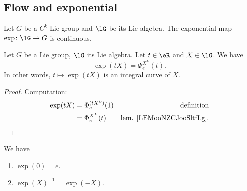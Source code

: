\subsection{Flow and exponential}

\begin{lemma}	\label{LEMooFHYAooNHHlsO}
	Let \( G\) be a \( C^k\) Lie group and \( \lG\) be its Lie algebra. The exponential map \(\exp \colon \lG\to G  \) is continuous.
\end{lemma}



\begin{lemma}        \label{LEMooGKDKooFTsDSr}
	Let \( G\) be a Lie group, \( \lG\) its Lie algebra. Let \( t\in \eR\) and \( X\in\lG\). We have
	\begin{equation}
		\exp(tX)=\Phi_e^{X^L}(t).
	\end{equation}
	In other words, \( t\mapsto \exp(tX)\) is an integral curve of \( X\).
\end{lemma}

\begin{proof}
	Computation:
	\begin{subequations}
		\begin{align}
			\exp(tX) & =\Phi_e^{(tX^L)}(1) & \text{definition}                    \\
			         & =\Phi_e^{X^L}(t)    & \text{lem. \ref{LEMooNZCJooSltfLg}}.
		\end{align}
	\end{subequations}
\end{proof}


\begin{lemma}       \label{LEMooEQFHooRjUAin}
	We have
	\begin{enumerate}
		\item		\label{ITEMooDPTQooDplUXD}
		      \( \exp(0)=e\).
		\item \label{ITEMooTQHIooFLaOnX}
		      \( \exp(X)^{-1}=\exp(-X)\).
	\end{enumerate}
\end{lemma}

